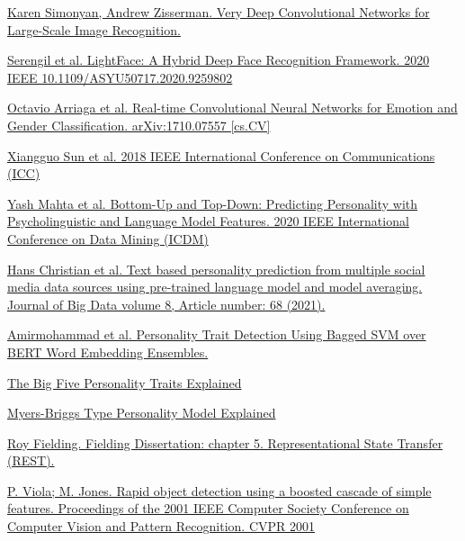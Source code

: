 \begin{thebibliography}{9}
\href{https://arxiv.org/abs/1409.1556}{Karen Simonyan, Andrew Zisserman. Very Deep Convolutional Networks for Large-Scale Image Recognition.}

\href{https://ieeexplore.ieee.org/document/9259802}{Serengil et al. LightFace: A Hybrid Deep Face Recognition Framework. 2020 IEEE 10.1109/ASYU50717.2020.9259802}

\href{https://arxiv.org/abs/1710.07557}{Octavio Arriaga et al. Real-time Convolutional Neural Networks for Emotion and Gender Classification. arXiv:1710.07557 [cs.CV]}

\href{https://ieeexplore.ieee.org/document/8422105}{Xiangguo Sun et al.  2018 IEEE International Conference on Communications (ICC)}

\href{https://sentic.net/predicting-personality-with-psycholinguistic-and-language-model-features.pdf}{Yash Mahta et al. Bottom-Up and Top-Down: Predicting Personality with Psycholinguistic and Language Model Features. 2020 IEEE International Conference on Data Mining (ICDM)}

\href{https://journalofbigdata.springeropen.com/articles/10.1186/s40537-021-00459-1}{Hans Christian et al. Text based personality prediction from multiple social media data sources using pre-trained language model and model averaging. Journal of Big Data volume 8, Article number: 68 (2021).}

\href{https://sentic.net/personality-detection-using-bagged-svm-over-bert.pdf}{Amirmohammad et al. Personality Trait Detection
Using Bagged SVM over BERT Word Embedding Ensembles.}

\href{https://www.verywellmind.com/the-big-five-personality-dimensions-2795422}{The Big Five Personality Traits Explained}

\href{https://www.truity.com/myers-briggs/about-myers-briggs-personality-typing}{Myers-Briggs Type Personality Model Explained}



\href{https://www.ics.uci.edu/~fielding/pubs/dissertation/rest_arch_style.htm}{Roy Fielding. Fielding Dissertation: chapter 5. Representational State Transfer (REST).}

\href{https://ieeexplore.ieee.org/abstract/document/990517}{P. Viola; M. Jones. Rapid object detection using a boosted cascade of simple features. Proceedings of the 2001 IEEE Computer Society Conference on Computer Vision and Pattern Recognition. CVPR 2001}


\end{thebibliography}
